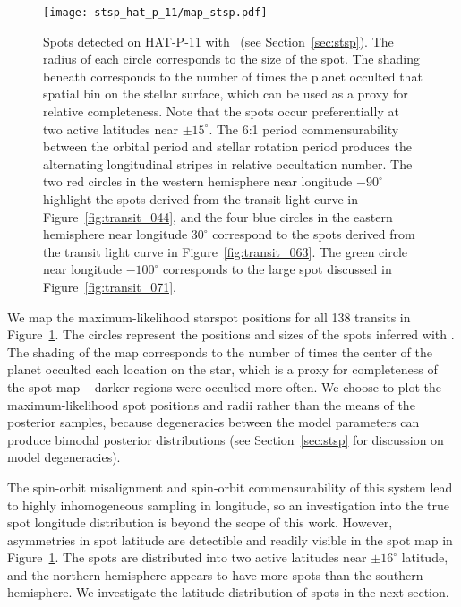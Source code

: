 \begin{figure}
\centering
\texttt{[image: stsp\_hat\_p\_11/map\_stsp.pdf]}
\caption{Spots detected on HAT-P-11 with \stsp\ (see Section~\ref{sec:stsp}). The radius of each circle corresponds to the size of the spot. The shading beneath corresponds to the number of times the planet occulted that spatial bin on the stellar surface, which can be used as a proxy for relative completeness. Note that the spots occur preferentially at two active latitudes near $\pm15^\circ$. The 6:1 period commensurability between the orbital period and stellar rotation period produces the alternating longitudinal stripes in relative occultation number. The two red circles in the western hemisphere near longitude $-90^\circ$ highlight the spots derived from the transit light curve in Figure~\ref{fig:transit_044}, and the four blue circles in the eastern hemisphere near longitude $30^\circ$ correspond to the spots derived from the transit light curve in Figure~\ref{fig:transit_063}. The green circle near longitude $-100^\circ$ corresponds to the large spot discussed in Figure~\ref{fig:transit_071}.}
\label{fig:h11map}
\end{figure}

We map the maximum-likelihood starspot positions for all 138 transits in Figure~\ref{fig:h11map}. The circles represent the positions and sizes of the spots inferred with \stsp. The shading of the map corresponds to the number of times the center of the planet occulted each location on the star, which is a proxy for completeness of the spot map -- darker regions were occulted more often. We choose to plot the maximum-likelihood spot positions and radii rather than the means of the posterior samples, because degeneracies between the model parameters can produce bimodal posterior distributions (see Section~\ref{sec:stsp} for discussion on model degeneracies).

The spin-orbit misalignment and spin-orbit commensurability of this system lead to highly inhomogeneous sampling in longitude, so an investigation into the true spot longitude distribution is beyond the scope of this work. However, asymmetries in spot latitude are detectible and readily visible in the spot map in Figure~\ref{fig:h11map}. The spots are distributed into two active latitudes near $\pm 16^\circ$ latitude, and the northern hemisphere appears to have more spots than the southern hemisphere. We investigate the latitude distribution of spots in the next section.

